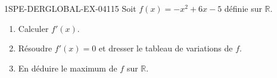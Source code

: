 \begin{exercice}{1SPE-DERGLOBAL-EX-041}{1}{5}
Soit $f(x) = -x^2 + 6x - 5$ définie sur $\mathbb{R}$.
\begin{enumerate}
  \item Calculer $f'(x)$.
  \item Résoudre $f'(x) = 0$ et dresser le tableau de variations de $f$.
  \item En déduire le maximum de $f$ sur $\mathbb{R}$.
\end{enumerate}
\end{exercice}
